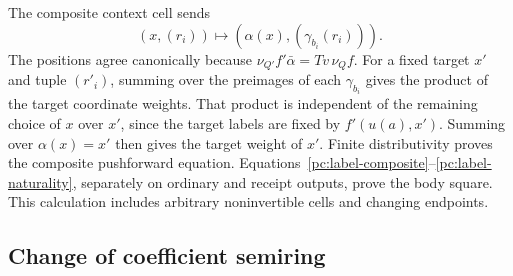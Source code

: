 \documentclass[11pt,a4paper]{article}
\theoremstyle{definition}
\begin{document}
The composite context cell sends
\[
 (x,(r_i))\longmapsto(\alpha(x),(\gamma_{b_i}(r_i))).
\]
The positions agree canonically because
$\nu_{Q'}f'\bar\alpha=Tv\,\nu_Qf$. For a fixed target $x'$ and
tuple $(r'_i)$, summing over the preimages of each $\gamma_{b_i}$ gives
the product of the target coordinate weights. That product is independent
of the remaining choice of $x$ over $x'$, since the target labels are fixed
by $f'(u(a),x')$. Summing over $\alpha(x)=x'$ then gives the target weight
of $x'$. Finite distributivity proves the composite pushforward equation.
Equations~\eqref{pc:label-composite}--\eqref{pc:label-naturality}, separately
on ordinary and receipt outputs, prove the body square. This calculation
includes arbitrary noninvertible cells and changing endpoints.

\subsection{Change of coefficient semiring}\label{pc:coefficients}
\end{document}
